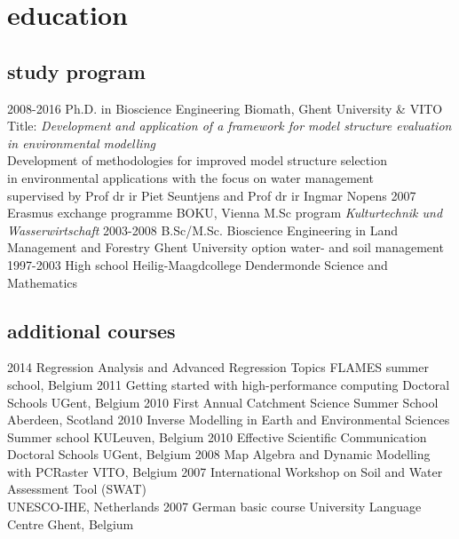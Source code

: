 \documentclass[]{stvhoey-cv}  %
\begin{document}
\section{education}
\subsection*{study program}
\begin{entrylist}
  \entry
    {2008-2016}
    {Ph.D. {\normalfont in Bioscience Engineering}}
    {Biomath, Ghent University \& VITO}
    {Title: \emph{Development and application of a framework for model structure evaluation in environmental modelling}\\
    Development of methodologies for improved model structure selection\\ in environmental applications with the focus on water management\\ \small{supervised by Prof dr ir Piet Seuntjens and Prof dr ir Ingmar Nopens}}
  \entry
    {2007}
    {Erasmus exchange programme}
    {BOKU, Vienna}
    {M.Sc program \textit{Kulturtechnik und Wasserwirtschaft}}
  \entry
    {2003-2008}
    {B.Sc/M.Sc. Bioscience Engineering in Land Management and Forestry}
    {Ghent University}
    {option water- and soil management}
  \entry
    {1997-2003}
    {High school}
    {Heilig-Maagdcollege Dendermonde}
    {Science and Mathematics}
\end{entrylist}

\subsection*{additional courses}
\begin{entrylist}
  \shortentry
    {2014}
    {Regression Analysis and Advanced Regression Topics}
    {FLAMES summer school, Belgium}
  \shortentry
    {2011}
    {Getting started with high-performance computing}
    {Doctoral Schools UGent, Belgium}
  \shortentry
    {2010}
    {First Annual Catchment Science Summer School}
    {Aberdeen, Scotland}
  \shortentry
    {2010}
    {Inverse Modelling in Earth and Environmental Sciences}
    {Summer school KULeuven, Belgium}
  \shortentry
    {2010}
    {Effective Scientific Communication}
    {Doctoral Schools UGent, Belgium}
  \shortentry
    {2008}
    {Map Algebra and Dynamic Modelling with PCRaster}
    {VITO, Belgium}
  \shortentry
    {2007}
    {International Workshop on Soil and Water Assessment Tool (SWAT)\\ }
    {UNESCO-IHE, Netherlands}
  \shortentry
    {2007}
    {German basic course}
    {University Language Centre Ghent, Belgium}
\end{entrylist}
\end{document}
